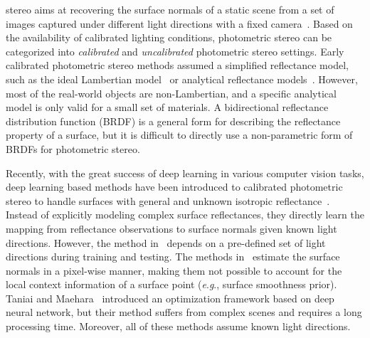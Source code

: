 \documentclass[10pt,journal,compsoc]{IEEEtran}
\newcommand{\eg}{\textit{e}.\textit{g}.}
\begin{document}
\maketitle

\IEEEdisplaynontitleabstractindextext



\IEEEpeerreviewmaketitle




 stereo aims at recovering the surface normals of a static scene from a set of images captured under different light directions with a fixed camera~\cite{woodham1980ps,silver1980determining}. Based on the availability of calibrated lighting conditions, photometric stereo can be categorized into \emph{calibrated} and \emph{uncalibrated} photometric stereo settings.
Early calibrated photometric stereo methods assumed a simplified reflectance model, such as the ideal Lambertian model~\cite{woodham1980ps,silver1980determining} or analytical reflectance models~\cite{tozza2016direct,chung2008efficient,ruiters2009heightfield}. 
However, most of the real-world objects are non-Lambertian, and a specific analytical model is only valid for a small set of materials. A bidirectional reflectance distribution function (BRDF) is a general form for describing the reflectance property of a surface, but it is difficult to directly use a non-parametric form of BRDFs for photometric stereo. 

Recently, with the great success of deep learning in various computer vision tasks, deep learning based methods have been introduced to calibrated photometric stereo to handle surfaces with general and unknown isotropic reflectance~\cite{santo2017deep,ikehata2018cnn,Taniai18}. Instead of explicitly modeling complex surface reflectances, they directly learn the mapping from reflectance observations to surface normals given known light directions. 
However, the method in~\cite{santo2017deep} depends on a pre-defined set of light directions during training and testing. The methods in~\cite{santo2017deep,ikehata2018cnn} estimate the surface normals in a pixel-wise manner, making them not possible to account for the local context information of a surface point (\eg, surface smoothness prior).
Taniai and Maehara~\cite{Taniai18} introduced an optimization framework based on deep neural network, but their method suffers from complex scenes and requires a long processing time. 
Moreover, all of these methods assume known light directions.
\end{document}
